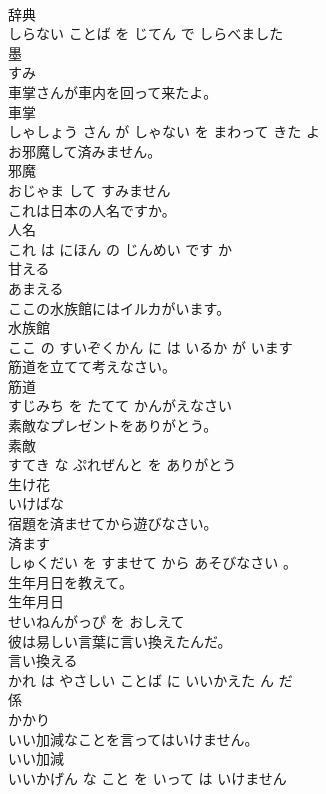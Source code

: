 \documentclass[8pt]{extreport}
\begin{document}
\begin{CJK}{UTF8}{min}
\\	辞典 
\\	しらない ことば を じてん で しらべました			
\\	墨	
\\	すみ		
\\	車掌さんが車内を回って来たよ。	
\\	車掌 
\\	しゃしょう さん が しゃない を まわって きた よ			
\\	お邪魔して済みません。	
\\	邪魔 
\\	おじゃま して すみません			
\\	これは日本の人名ですか。	
\\	人名 
\\	これ は にほん の じんめい です か			
\\	甘える	
\\	あまえる		
\\	ここの水族館にはイルカがいます。	
\\	水族館 
\\	ここ の すいぞくかん に は いるか が います			
\\	筋道を立てて考えなさい。	
\\	筋道 
\\	すじみち を たてて かんがえなさい			
\\	素敵なプレゼントをありがとう。	
\\	素敵 
\\	すてき な ぷれぜんと を ありがとう			
\\	生け花	
\\	いけばな		
\\	宿題を済ませてから遊びなさい。	
\\	済ます 
\\	しゅくだい を すませて から あそびなさい 。			
\\	生年月日を教えて。	
\\	生年月日 
\\	せいねんがっぴ を おしえて			
\\	彼は易しい言葉に言い換えたんだ。	
\\	言い換える 
\\	かれ は やさしい ことば に いいかえた ん だ			
\\	係	
\\	かかり		
\\	いい加減なことを言ってはいけません。	
\\	いい加減 
\\	いいかげん な こと を いって は いけません			

\end{CJK}
\end{document}
